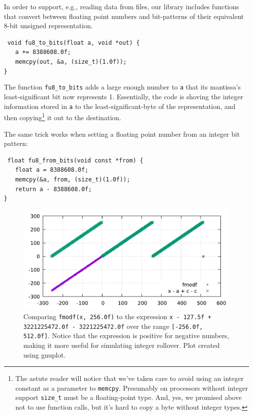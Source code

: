 \documentclass{acmsiggraph}
\theoremstyle{remark}
\theoremstyle{definition}
\begin{document}
In order to support, e.g., reading data from files, our library includes functions that convert between floating point numbers and bit-patterns of their equivalent 8-bit unsigned representation.

{\tt
void fu8\_to\_bits(float a, void *out) \{ \\
$\phantom{XX}$a += 8388608.0f; \\
$\phantom{XX}$memcpy(out, \&a, (size\_t)(1.0f)); \\
\}
}

The function {\tt fu8\_to\_bits} adds a large enough number to {\tt a} that its mantissa's least-significant bit now represents 1.
Essentially, the code is shoving the integer information stored in {\tt a} to the least-significant-byte of the representation, and then copying\footnote{
The astute reader will notice that we've taken care to avoid using an integer constant as a parameter to {\tt memcpy}.
Presumably on processors without integer support {\tt size\_t} must be a floating-point type.
And, yes, we promised above not to use function calls, but it's hard to copy a byte without integer types.
} it out to the destination.

The same trick works when setting a floating point number from an integer bit pattern:

{\tt
float fu8\_from\_bits(void const *from) \{ \\
$\phantom{XX}$float a = 8388608.0f; \\
$\phantom{XX}$memcpy(\&a, from, (size\_t)(1.0f)); \\
$\phantom{XX}$return a - 8388608.0f; \\
\}
}


\begin{figure}[tb!]
\includegraphics[width=\columnwidth]{fmodf.pdf}
\caption{\label{fig-mod-graph} Comparing {\tt fmodf(x, 256.0f)} to the expression {\tt x - 127.5f + 3221225472.0f - 3221225472.0f} over the range {\tt [-256.0f, 512.0f]}.
Notice that the expression is positive for negative numbers, making it more useful for simulating integer rollover.
{\small Plot created using gnuplot.}}
\end{figure}
\end{document}
